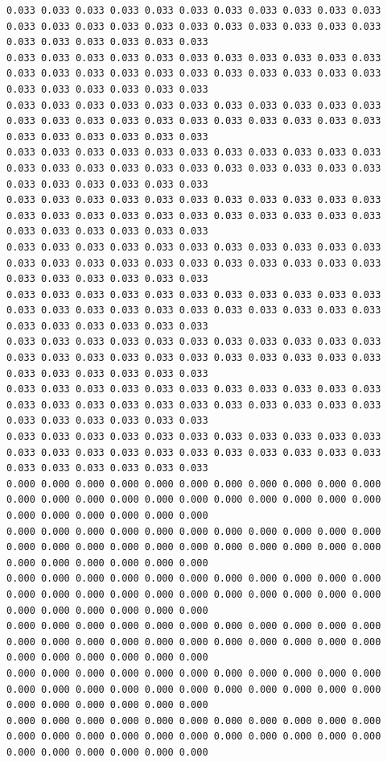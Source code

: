 \begin{lstlisting}[caption= Input file for 4 well example , label=lst:wellfield]
0.033 0.033 0.033 0.033 0.033 0.033 0.033 0.033 0.033 0.033 0.033 0.033 0.033 0.033 0.033 0.033 0.033 0.033 0.033 0.033 0.033 0.033 0.033 0.033 0.033 0.033 0.033 0.033
0.033 0.033 0.033 0.033 0.033 0.033 0.033 0.033 0.033 0.033 0.033 0.033 0.033 0.033 0.033 0.033 0.033 0.033 0.033 0.033 0.033 0.033 0.033 0.033 0.033 0.033 0.033 0.033
0.033 0.033 0.033 0.033 0.033 0.033 0.033 0.033 0.033 0.033 0.033 0.033 0.033 0.033 0.033 0.033 0.033 0.033 0.033 0.033 0.033 0.033 0.033 0.033 0.033 0.033 0.033 0.033
0.033 0.033 0.033 0.033 0.033 0.033 0.033 0.033 0.033 0.033 0.033 0.033 0.033 0.033 0.033 0.033 0.033 0.033 0.033 0.033 0.033 0.033 0.033 0.033 0.033 0.033 0.033 0.033
0.033 0.033 0.033 0.033 0.033 0.033 0.033 0.033 0.033 0.033 0.033 0.033 0.033 0.033 0.033 0.033 0.033 0.033 0.033 0.033 0.033 0.033 0.033 0.033 0.033 0.033 0.033 0.033
0.033 0.033 0.033 0.033 0.033 0.033 0.033 0.033 0.033 0.033 0.033 0.033 0.033 0.033 0.033 0.033 0.033 0.033 0.033 0.033 0.033 0.033 0.033 0.033 0.033 0.033 0.033 0.033
0.033 0.033 0.033 0.033 0.033 0.033 0.033 0.033 0.033 0.033 0.033 0.033 0.033 0.033 0.033 0.033 0.033 0.033 0.033 0.033 0.033 0.033 0.033 0.033 0.033 0.033 0.033 0.033
0.033 0.033 0.033 0.033 0.033 0.033 0.033 0.033 0.033 0.033 0.033 0.033 0.033 0.033 0.033 0.033 0.033 0.033 0.033 0.033 0.033 0.033 0.033 0.033 0.033 0.033 0.033 0.033
0.033 0.033 0.033 0.033 0.033 0.033 0.033 0.033 0.033 0.033 0.033 0.033 0.033 0.033 0.033 0.033 0.033 0.033 0.033 0.033 0.033 0.033 0.033 0.033 0.033 0.033 0.033 0.033
0.033 0.033 0.033 0.033 0.033 0.033 0.033 0.033 0.033 0.033 0.033 0.033 0.033 0.033 0.033 0.033 0.033 0.033 0.033 0.033 0.033 0.033 0.033 0.033 0.033 0.033 0.033 0.033
0.000 0.000 0.000 0.000 0.000 0.000 0.000 0.000 0.000 0.000 0.000 0.000 0.000 0.000 0.000 0.000 0.000 0.000 0.000 0.000 0.000 0.000 0.000 0.000 0.000 0.000 0.000 0.000
0.000 0.000 0.000 0.000 0.000 0.000 0.000 0.000 0.000 0.000 0.000 0.000 0.000 0.000 0.000 0.000 0.000 0.000 0.000 0.000 0.000 0.000 0.000 0.000 0.000 0.000 0.000 0.000
0.000 0.000 0.000 0.000 0.000 0.000 0.000 0.000 0.000 0.000 0.000 0.000 0.000 0.000 0.000 0.000 0.000 0.000 0.000 0.000 0.000 0.000 0.000 0.000 0.000 0.000 0.000 0.000
0.000 0.000 0.000 0.000 0.000 0.000 0.000 0.000 0.000 0.000 0.000 0.000 0.000 0.000 0.000 0.000 0.000 0.000 0.000 0.000 0.000 0.000 0.000 0.000 0.000 0.000 0.000 0.000
0.000 0.000 0.000 0.000 0.000 0.000 0.000 0.000 0.000 0.000 0.000 0.000 0.000 0.000 0.000 0.000 0.000 0.000 0.000 0.000 0.000 0.000 0.000 0.000 0.000 0.000 0.000 0.000
0.000 0.000 0.000 0.000 0.000 0.000 0.000 0.000 0.000 0.000 0.000 0.000 0.000 0.000 0.000 0.000 0.000 0.000 0.000 0.000 0.000 0.000 0.000 0.000 0.000 0.000 0.000 0.000

\end{lstlisting}
